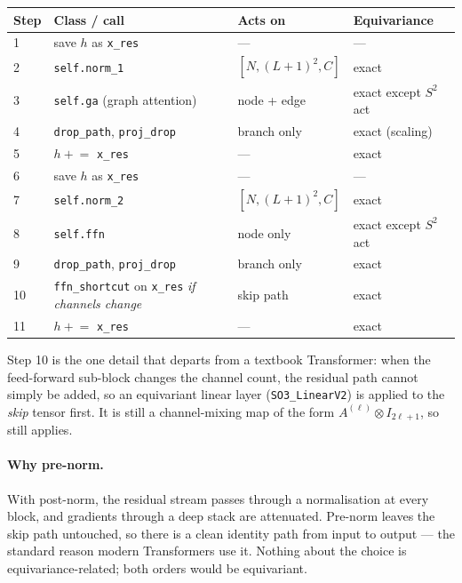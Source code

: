 \documentclass[11pt,a4paper]{report}
\theoremstyle{definition}
\theoremstyle{remark}
\newcommand{\pyfunc}[1]{\texttt{#1}}
\begin{document}
\begin{center}
\begin{tabular}{llll}
\toprule
Step & Class / call & Acts on & Equivariance \\
\midrule
1 & save $h$ as \texttt{x\_res} & --- & --- \\
2 & \pyfunc{self.norm\_1} & $[N,(L{+}1)^2,C]$ & exact \\
3 & \pyfunc{self.ga} (graph attention) & node + edge & exact except $S^2$ act \\
4 & \pyfunc{drop\_path}, \pyfunc{proj\_drop} & branch only & exact (scaling) \\
5 & $h \mathrel{+}= $ \texttt{x\_res} & --- & exact \\
6 & save $h$ as \texttt{x\_res} & --- & --- \\
7 & \pyfunc{self.norm\_2} & $[N,(L{+}1)^2,C]$ & exact \\
8 & \pyfunc{self.ffn} & node only & exact except $S^2$ act \\
9 & \pyfunc{drop\_path}, \pyfunc{proj\_drop} & branch only & exact \\
10 & \pyfunc{ffn\_shortcut} on \texttt{x\_res} \emph{if channels change} & skip path & exact \\
11 & $h \mathrel{+}= $ \texttt{x\_res} & --- & exact \\
\bottomrule
\end{tabular}
\end{center}

Step 10 is the one detail that departs from a textbook Transformer: when the
feed-forward sub-block changes the channel count, the residual path cannot
simply be added, so an equivariant linear layer (\pyfunc{SO3\_LinearV2}) is
applied to the \emph{skip} tensor first. It is still a channel-mixing map of
the form $A^{(\ell)}\otimes I_{2\ell+1}$, so 
still applies.

\paragraph{Why pre-norm.} With post-norm, the residual stream passes through a
normalisation at every block, and gradients through a deep stack are
attenuated. Pre-norm leaves the skip path untouched, so there is a clean
identity path from input to output --- the standard reason modern
Transformers use it. Nothing about the choice is equivariance-related; both
orders would be equivariant.
\end{document}
